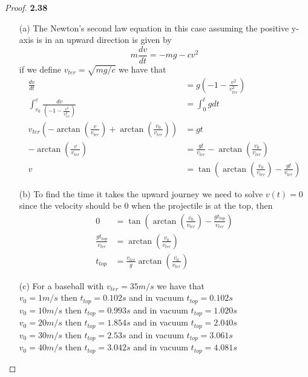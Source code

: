 \documentclass[11pt]{article}
\theoremstyle{definition}
\begin{document}
    \begin{proof}{\textbf{2.38}}
        \begin{itemize}
        \item[(a)] The Newton's second law equation in this case assuming the
        positive y-axis is in an upward direction is given by
        $$m\frac{dv}{dt} = -mg - cv^2$$
        if we define $v_{ter} = \sqrt{mg/c}$ we have that
        \begin{align*}
            \frac{dv}{dt} &= g\left(-1 - \frac{v^2}{v_{ter}^2}\right)\\
            \int_{v_0}^v\frac{dv}{\left(-1 - \frac{v^2}{v_{ter}^2}\right)}
                &= \int_{0}^tgdt\\
            v_{ter}\left(-\arctan(\frac{v}{v_{ter}}) + \arctan(\frac{v_{0}}{v_{ter}})\right)
                &= gt\\
            -\arctan(\frac{v}{v_{ter}}) &= \frac{gt}{v_{ter}} - \arctan(\frac{v_0}{v_{ter}})\\
            v &= \tan\left(\arctan(\frac{v_0}{v_{ter}}) - \frac{gt}{v_{ter}}\right)
        \end{align*}
        \item[(b)] To find the time it takes the upward journey we need to solve
        $v(t)=0$ since the velocity should be $0$ when the projectile is at the
        top, then
        \begin{align*}
            0 &= \tan\left(\arctan(\frac{v_0}{v_{ter}}) - \frac{gt_{top}}{v_{ter}}\right)\\
            \frac{gt_{top}}{v_{ter}} &= \arctan(\frac{v_0}{v_{ter}}) \\
            t_{top} &= \frac{v_{ter}}{g}\arctan(\frac{v_0}{v_{ter}})
        \end{align*}
        \item[(c)] For a baseball with $v_{ter} = 35 \si{m/s}$ we have that\\
        $v_0 = 1 \si{m/s}$ then $t_{top} = 0.102 \si{s}$ and in vacuum 
        $t_{top} = 0.102\si{s}$\\
        $v_0 = 10 \si{m/s}$ then $t_{top} = 0.993 \si{s}$ and in vacuum 
        $t_{top} = 1.020\si{s}$\\
        $v_0 = 20 \si{m/s}$ then $t_{top} = 1.854 \si{s}$ and in vacuum 
        $t_{top} = 2.040\si{s}$\\
        $v_0 = 30 \si{m/s}$ then $t_{top} = 2.53 \si{s}$ and in vacuum 
        $t_{top} = 3.061\si{s}$\\
        $v_0 = 40 \si{m/s}$ then $t_{top} = 3.042 \si{s}$ and in vacuum 
        $t_{top} = 4.081\si{s}$\\
        \end{itemize}
    \end{proof}
\end{document}
